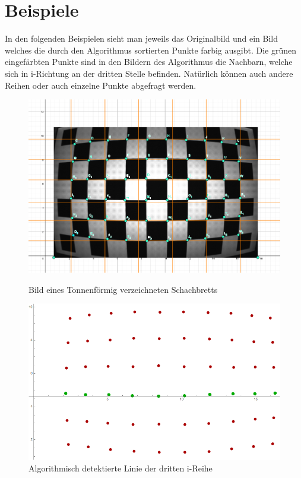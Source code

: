 \section{Beispiele}

In den folgenden Beispielen sieht man jeweils das Originalbild und ein Bild welches die durch den Algorithmus sortierten Punkte farbig ausgibt. Die grünen eingefärbten Punkte sind in den Bildern des Algorithmus die Nachbarn, welche sich in i-Richtung an der dritten Stelle befinden. Natürlich können auch andere Reihen oder auch einzelne Punkte abgefragt werden. 

\begin{figure}[!htb]
	\includegraphics[width=\linewidth]{images/Tonnenverzeichnung.png}
	\caption{Bild eines Tonnenförmig verzeichneten Schachbretts}
	\label{fig:awesome_image1}
	\endminipage\hfill
	\includegraphics[width=\linewidth]{images/AlgTonnenverzeichnung.png}
	\caption{Algorithmisch detektierte Linie der dritten i-Reihe}
	\label{fig:awesome_image2}
	\endminipage\hfill
\end{figure}

